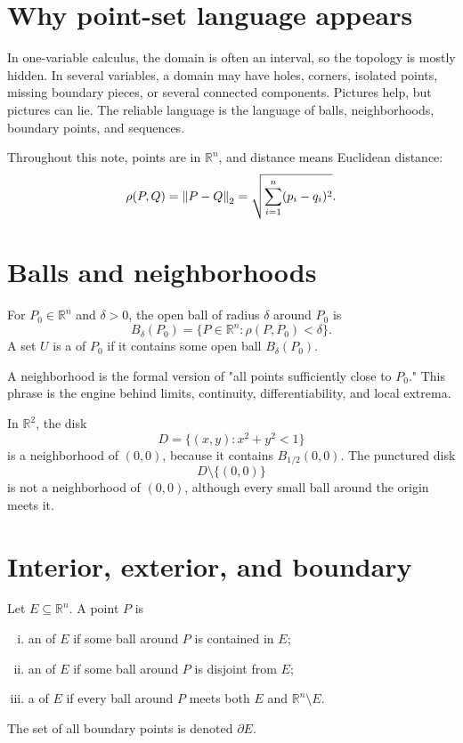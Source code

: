
\section{Why point-set language appears}

In one-variable calculus, the domain is often an interval, so the topology is mostly hidden.  In several variables, a domain may have holes, corners, isolated points, missing boundary pieces, or several connected components.  Pictures help, but pictures can lie.  The reliable language is the language of balls, neighborhoods, boundary points, and sequences.

Throughout this note, points are in \(\mathbb R^n\), and distance means Euclidean distance:
\[
  \rho(P,Q)=\left\lVert P-Q \right\rVert_2
  =\sqrt{\sum_{i=1}^n(p_i-q_i)^2}.
\]

\section{Balls and neighborhoods}

\begin{definition}
For \(P_0\in\mathbb R^n\) and \(\delta>0\), the open ball of radius \(\delta\) around \(P_0\) is
\[
  B_\delta(P_0)=\{P\in\mathbb R^n:\rho(P,P_0)<\delta\}.
\]
A set \(U\) is a  of \(P_0\) if it contains some open ball \(B_\delta(P_0)\).
\end{definition}

A neighborhood is the formal version of "all points sufficiently close to \(P_0\)."  This phrase is the engine behind limits, continuity, differentiability, and local extrema.

\begin{example}
In \(\mathbb R^2\), the disk
\[
  D=\{(x,y):x^2+y^2<1\}
\]
is a neighborhood of \((0,0)\), because it contains \(B_{1/2}(0,0)\).  The punctured disk
\[
  D\setminus\{(0,0)\}
\]
is not a neighborhood of \((0,0)\), although every small ball around the origin meets it.
\end{example}

\section{Interior, exterior, and boundary}

\begin{definition}
Let \(E\subseteq\mathbb R^n\).  A point \(P\) is
\begin{enumerate}[(i)]
  \item an  of \(E\) if some ball around \(P\) is contained in \(E\);
  \item an  of \(E\) if some ball around \(P\) is disjoint from \(E\);
  \item a  of \(E\) if every ball around \(P\) meets both \(E\) and \(\mathbb R^n\setminus E\).
\end{enumerate}
The set of all boundary points is denoted \(\partial E\).
\end{definition}

